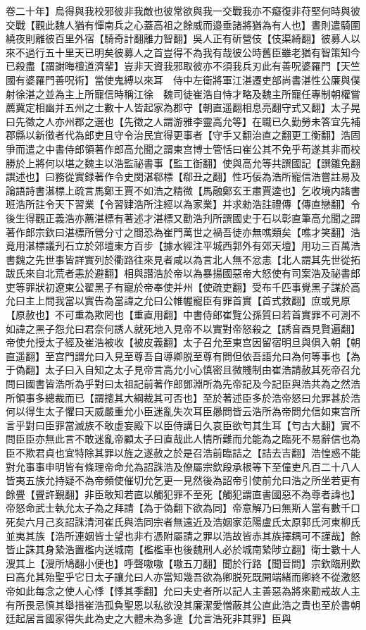 卷二十年】烏得與我校邪彼非我敵也彼常欲與我一交戰我亦不癡復非苻堅何時與彼交戰【觀此魏人猶有憚南兵之心蓋高祖之餘威而邉垂諸將猶為有人也】晝則遣騎圍繞夜則離彼百里外宿【騎奇計翻離力智翻】吳人正有斫營伎【伎渠綺翻】彼募人以來不過行五十里天已明矣彼募人之首豈得不為我有哉彼公時舊臣雖老猶有智策知今已殺盡【謂謝晦檀道濟輩】豈非天資我邪取彼亦不須我兵刃此有善呪婆羅門【天竺國有婆羅門善呪術】當使鬼縛以來耳　侍中左衛將軍江湛遷吏部尚書湛性公廉與僕射徐湛之並為主上所寵信時稱江徐　魏司徒崔浩自恃才略及魏主所寵任專制朝權嘗薦冀定相幽并五州之士數十人皆起家為郡守【朝直遥翻相息亮翻守式又翻】太子晃曰先徵之人亦州郡之選也【先徵之人謂游雅李靈高允等】在職已久勤勞未答宜先補郡縣以新徵者代為郎吏且守令治民宜得更事者【守手又翻治直之翻更工衡翻】浩固爭而遣之中書侍郎領著作郎高允聞之謂東宫博士管恬曰崔公其不免乎苟遂其非而校勝於上將何以堪之魏主以浩監祕書事【監工衘翻】使與高允等共譔國記【譔雛免翻譔述也】曰務從實録著作令史閔湛郗標【郗丑之翻】性巧佞為浩所寵信浩嘗註易及論語詩書湛標上疏言馬鄭王賈不如浩之精微【馬融鄭玄王肅賈逵也】乞收境内諸書班浩所註令天下習業【令習肄浩所注經以為家業】并求勑浩註禮傳【傳直戀翻】令後生得觀正義浩亦薦湛標有著述才湛標又勸浩刋所譔國史于石以彰直筆高允聞之謂著作郎宗欽曰湛標所營分寸之間恐為崔門萬世之禍吾徒亦無噍類矣【噍才笑翻】浩竟用湛標議刋石立於郊壇東方百步【據水經注平城西郭外有郊天壇】用功三百萬浩書魏之先世事皆詳實列於衢路往來見者咸以為言北人無不忿恚【北人謂其先世從拓跋氏來自北荒者恚於避翻】相與譛浩於帝以為暴揚國惡帝大怒使有司案浩及祕書郎吏等罪狀初遼東公翟黑子有寵於帝奉使并州【使疏吏翻】受布千匹事覺黑子謀於高允曰主上問我當以實告為當諱之允曰公帷幄寵臣有罪首實【首式救翻】庶或見原【原赦也】不可重為欺罔也【重直用翻】中書侍郎崔覽公孫質曰若首實罪不可測不如諱之黑子怨允曰君奈何誘人就死地入見帝不以實對帝怒殺之【誘音酉見賢遍翻】帝使允授太子經及崔浩被收【被皮義翻】太子召允至東宫因留宿明旦與俱入朝【朝直遥翻】至宫門謂允曰入見至尊吾自導卿脱至尊有問但依吾語允曰為何等事也【為于偽翻】太子曰入自知之太子見帝言高允小心慎密且微賤制由崔浩請赦其死帝召允問曰國書皆浩所為乎對曰太祖記前著作郎鄧淵所為先帝記及今記臣與浩共為之然浩所領事多總裁而已【謂摠其大綱裁其可否也】至於著述臣多於浩帝怒曰允罪甚於浩何以得生太子懼曰天威嚴重允小臣迷亂失次耳臣曏問皆云浩所為帝問允信如東宫所言乎對曰臣罪當滅族不敢虚妄殿下以臣侍講日久哀臣欲匄其生耳【匄古大翻】實不問臣臣亦無此言不敢迷亂帝顧太子曰直哉此人情所難而允能為之臨死不易辭信也為臣不欺君貞也宜特除其罪以旌之遂赦之於是召浩前臨詰之【詰去吉翻】浩惶惑不能對允事事申明皆有條理帝命允為詔誅浩及僚屬宗欽段承根等下至僮吏凡百二十八人皆夷五族允持疑不為帝頻使催切允乞更一見然後為詔帝引使前允曰浩之所坐若更有餘舋【舋許覲翻】非臣敢知若直以觸犯罪不至死【觸犯謂直書國惡不為尊者諱也】帝怒命武士執允太子為之拜請【為于偽翻下欲為同】帝意解乃曰無斯人當有數千口死矣六月己亥詔誅清河崔氏與浩同宗者無遠近及浩姻家范陽盧氏太原郭氏河東柳氏並夷其族【浩所連姻皆士望也非冇憑附屬請之罪以浩故皆赤其族擇耦可不謹哉】餘皆止誅其身縶浩置檻内送城南【檻檻車也後魏刑人必於城南縶陟立翻】衛士數十人溲其上【溲所鳩翻小便也】呼聲嗷嗷【嗷五刀翻】聞於行路【聞音問】宗欽臨刑歎曰高允其殆聖乎它日太子讓允曰人亦當知幾吾欲為卿脱死既開端緒而卿終不從激怒帝如此每念之使人心悸【悸其季翻】允曰夫史者所以記人主善惡為將來勸戒故人主有所畏忌慎其舉措崔浩孤負聖恩以私欲没其廉潔愛憎蔽其公直此浩之責也至於書朝廷起居言國家得失此為史之大體未為多違【允言浩死非其罪】臣與
